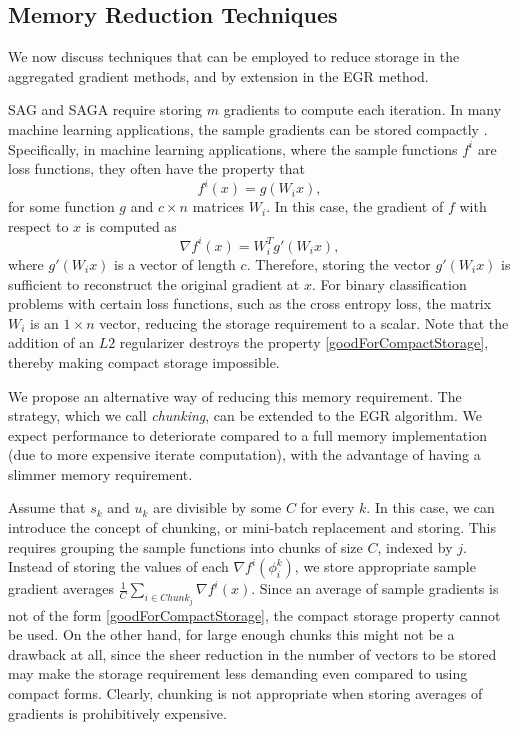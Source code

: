 \documentclass[11pt]{article}
\begin{document}
  
\bigskip
\subsection{Memory Reduction Techniques}
 \label{memred}
We now discuss techniques that can be employed to reduce storage in the aggregated gradient methods, and by extension in the EGR method.

SAG and SAGA require storing $m$ gradients to compute each iteration. In many machine learning applications, the sample gradients can be stored compactly \cite{roux2012stochastic}.   Specifically, in machine learning applications, where the sample functions $f^i$ are loss functions, they often have the property that
	\begin{equation}
		\label{goodForCompactStorage}
		f^i(x) = g (W_i x),
	\end{equation}
	for some function $g$ and $c \times n$ matrices $W_i$. In this case, the gradient of $f$ with respect to $x$ is computed as
	\begin{equation}
		\nabla f^i(x) =  W_i^T g' ( W_i x),
	\end{equation}
	where $g' ( W_i x)$ is a vector of length $c$. Therefore, storing the vector $g' ( W_i x)$ is sufficient to reconstruct the original gradient at $x$. For binary classification problems with certain loss functions, such as the cross entropy loss, the matrix $W_i$ is an $1 \times n$ vector, reducing the storage requirement to a scalar. Note that the addition of an $L2$ regularizer destroys the property \eqref{goodForCompactStorage}, thereby making compact storage impossible. 



We propose an alternative way of reducing this memory requirement. The strategy, which we call \emph{chunking}, can be extended to the EGR algorithm. We expect performance to deteriorate compared to a full memory implementation (due to more expensive iterate computation), with the advantage of having a slimmer memory requirement.
   

   
	Assume that $s_k$ and $u_k$ are divisible by some $C$ for every $k$. In this case, we can introduce the concept of chunking, or mini-batch replacement and storing. This requires grouping the sample functions into chunks of size $C$, indexed by $j$. Instead of storing the values of each $ \nabla f^i(\phi_i^k)$, we store appropriate sample gradient averages $\frac{1}{C} \sum_{i \in Chunk_j}  \nabla f^i(x)$. Since an average of sample gradients is not of the form \eqref{goodForCompactStorage}, the compact storage property cannot be used. On the other hand, for large enough chunks this might not be a drawback at all, since the sheer reduction in the number of vectors to be stored may make the storage requirement less demanding even compared to using compact forms. Clearly, chunking is not appropriate when storing averages of gradients is prohibitively expensive.  
\end{document}
